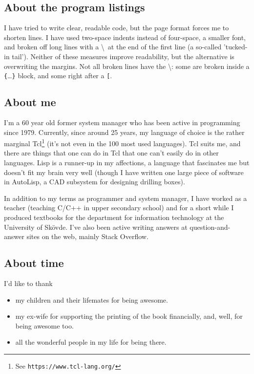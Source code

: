 \documentclass[twoside,9pt]{report}
\begin{document}
\subsection{About the program listings}
\label{about-the-program-listings}

I have tried to write clear, readable code, but the page format forces me to
shorten lines. I have used two-space indents instead of four-space, a smaller
font, and broken off long lines with a \textbackslash\  at the end of the first
line (a so-called 'tucked-in tail'). Neither of these measures improve
readability, but the alternative is overwriting the margins. Not all broken
lines have the \textbackslash: some are broken inside a
\texttt{\{}\ldots\texttt{\}} block, and some right after a \texttt{^^5b}.

\subsection{About me}
\label{about-me}

I'm a 60 year old former system manager who has been active in programming
since 1979. Currently, since around 25 years, my language of choice is the
rather marginal Tcl\footnote{See \texttt{https://www.tcl-lang.org/}} (it's not
even in the 100 most used languages). Tcl suits me, and there are things that
one can do in Tcl that one can't easily do in other languages. Lisp is a
runner-up in my affections, a language that fascinates me but doesn't fit my
brain very well (though I have written one large piece of software in AutoLisp,
a CAD subsystem for designing drilling boxes).

In addition to my terms as programmer and system manager, I have worked as a
teacher (teaching C/C++ in upper secondary school) and for a short while I
produced textbooks for the department for information technology at
the University of Skövde. I've also been active writing answers at
question-and-answer sites on the web, mainly Stack Overflow.

\subsection{About time}
\label{about-time}

I'd like to thank

\begin{itemize}
\item my children and their lifemates for being awesome.

\item my ex-wife for supporting the printing of the book financially, and, well, for being awesome too.

\item all the wonderful people in my life for being there.
\end{itemize}
\end{document}
